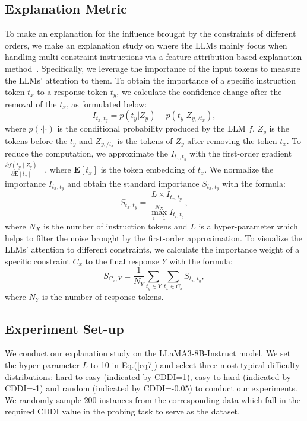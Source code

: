 \subsection{Explanation Metric}
To make an explanation for the influence brought by the constraints of different orders, we make an explanation study on where the LLMs mainly focus when handling multi-constraint instructions via a feature attribution-based explanation method~\cite{li2016visualizing, wu2020perturbed}. Specifically, we leverage the importance of the input tokens to measure the LLMs' attention to them. To obtain the importance of a specific instruction token $t_x$ to a response token $t_y$, we calculate the confidence change after the removal of the $t_x$, as formulated below:
\begin{equation}
    \label{eq6}
    I_{t_x,t_y}=p(t_y|Z_y)-p(t_y|Z_{y,/t_x}),
\end{equation}
where $p(\cdot|\cdot)$ is the conditional probability produced by the LLM $f$, $Z_y$ is the tokens before the $t_y$ and $Z_{y,/t_x}$ is the tokens of $Z_y$ after removing the token $t_x$. To reduce the computation, we approximate the $I_{t_x,t_y}$ with the first-order gradient $\frac{\partial f\left(t_y \mid Z_y\right)}{\partial \mathbf{E}\left[t_x\right]}$ ~\cite{wu2023language}, where $\mathbf{E}\left[t_x\right]$ is the token embedding of $t_x$. We normalize the importance $I_{t_x,t_y}$ and obtain the standard importance $S_{t_x,t_y}$ with the formula:
\begin{equation}
    \label{eq7}
    S_{t_x,t_y}= \frac{L\times I_{t_x,t_y}}{{\max_{i=1}^{N_{X}}}I_{t_i,t_y}},
\end{equation}
where $N_X$ is the number of instruction tokens and $L$ is a hyper-parameter which helps to filter the noise brought by the first-order approximation. To visualize the LLMs' attention to different constraints, we calculate the importance weight of a specific constraint $C_x$ to the final response $Y$ with the formula:
\begin{equation}
    \label{eq8}
    S_{C_x,Y}=\frac{1}{N_Y}\sum_{t_y\in Y}\sum_{t_x\in C_x}S_{t_x,t_y},
\end{equation}
where $N_Y$ is the number of response tokens.







\subsection{Experiment Set-up}
We conduct our explanation study on the LLaMA3-8B-Instruct model. We set the hyper-parameter $L$ to 10 in Eq.(\ref{eq7}) and select three most typical difficulty distributions: hard-to-easy (indicated by CDDI=1), easy-to-hard (indicated by CDDI=-1) and random (indicated by CDDI=-0.05) to conduct our experiments. We randomly sample 200 instances from the corresponding data which fall in the required CDDI value in the probing task to serve as the dataset.







